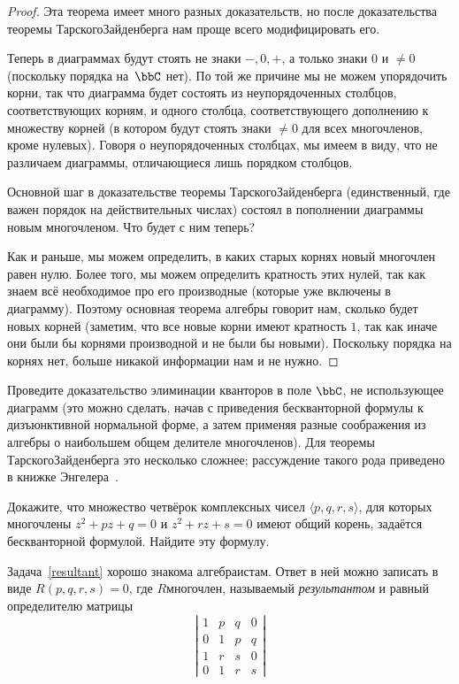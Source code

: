 \begin{proof}
Эта теорема имеет много разных доказательств, но после
доказательства теоремы Тарского\ч Зайденберга нам проще всего
модифицировать его.

Теперь в диаграммах будут стоять не знаки $-,0,+$, а только
знаки $0$ и ${\ne}0$ (поскольку порядка на~$\bbC$ нет). По той же
причине мы не можем упорядочить корни, так что диаграмма будет
состоять из неупорядоченных столбцов, соответствующих корням, и
одного столбца, соответствующего дополнению к множеству корней
(в котором будут стоять знаки ${\ne}0$ для всех многочленов,
кроме нулевых). Говоря о неупорядоченных столбцах, мы имеем в
виду, что не различаем диаграммы, отличающиеся лишь порядком
столбцов.

Основной шаг в доказательстве теоремы Тарского\Ч Зайденберга
(единственный, где важен порядок на действительных
числах) состоял в пополнении диаграммы новым многочленом. Что
будет с ним теперь?

Как и раньше, мы можем определить, в каких старых корнях новый
многочлен равен нулю. Более того, мы можем определить кратность
этих нулей, так как знаем всё необходимое про его производные
(которые уже включены в диаграмму). Поэтому основная теорема
алгебры говорит нам, сколько будет новых корней (заметим, что все
новые корни имеют кратность $1$, так как иначе они были бы
корнями производной и не были бы новыми). Поскольку порядка
на корнях нет, больше никакой информации нам и не нужно.
\end{proof}

\begin{problem}
Проведите доказательство элиминации кванторов в поле $\bbC$, не
использующее диаграмм (это можно сделать, начав с приведения
бескванторной формулы к дизъюнктивной нормальной форме, а затем
применяя разные соображения из алгебры о наибольшем общем
делителе многочленов). Для теоремы Тарского\ч Зайденберга это
несколько сложнее; рассуждение такого рода приведено в книжке
Энгелера~\cite{engeler}.
\end{problem}

\begin{problem}
        \label{resultant}%
Докажите, что множество  четвёрок комплексных чисел
$\langle p,q,r,s\rangle$, для которых многочлены $z^2+pz+q=0$ и $z^2+rz+s=0$
имеют общий корень, задаётся бескванторной формулой.
Найдите эту формулу.
\end{problem}
Задача~\ref{resultant}
хорошо знакома алгебраистам. Ответ в ней можно
записать в виде $R(p,q,r,s)=0$, где $R$\т многочлен, называемый
\emph{результантом}%
и равный определителю матрицы
        $$
\left|
\begin{array}{cccc}
 1 &  p & q & 0 \\
 0 &  1 & p & q \\
 1 &  r & s & 0 \\
 0 &  1 & r & s
\end{array}
\right|
        $$

